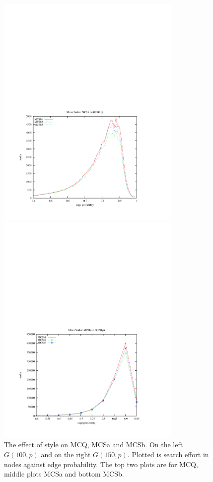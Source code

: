 \documentclass{l4proj}
\begin{document}
\begin{figure}
\begin{center}
\begin{minipage}[t]{0.49\textwidth}
\end{minipage}
\end{center}
\vspace{-6cm}
\begin{center}
\hspace{-1.5cm}
\begin{minipage}[t]{0.49\textwidth}
\includegraphics[height=11.5cm]{mcsb-style-100.pdf}
\end{minipage}
\hfill
\begin{minipage}[t]{0.49\textwidth}
\includegraphics[height=11.5cm]{mcsb-style-150.pdf}
\end{minipage}
\end{center}
\caption{The effect of style on MCQ, MCSa and MCSb. On the left $G(100,p)$ and on the right $G(150,p)$. Plotted is search effort in nodes against
edge probability. The top two plots are for MCQ, middle plots MCSa and bottom MCSb.}
\label{mc-style}
\end{figure}
\end{document}
